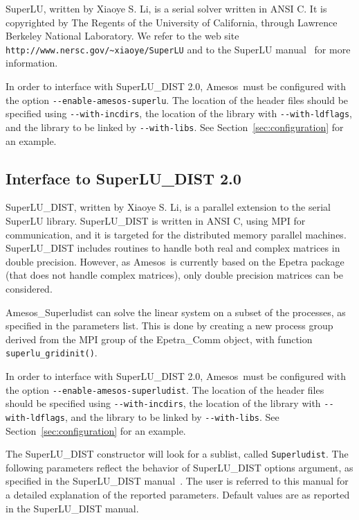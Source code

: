 \documentclass[11pt]{SANDreport}
\newcommand{\amesos}{{\sc Amesos}}
\begin{document}
SuperLU, written by Xiaoye S. Li, is a serial solver
written in ANSI C. It is copyrighted by The Regents of the University of
California, through Lawrence Berkeley National Laboratory.  We refer to
the web site
\verb!http://www.nersc.gov/~xiaoye/SuperLU!
and to the SuperLU manual~\cite{superlu-manual} for more
information.

In order to interface with SuperLU\_DIST 2.0, \amesos\ must be configured with
the option \verb!--enable-amesos-superlu!.
The location of the header files should be specified using \verb!--with-incdirs!,
the location of the library with \verb!--with-ldflags!, and the library
to be linked by \verb!--with-libs!. See Section~\ref{sec:configuration} for an
example.

\subsection{Interface to SuperLU\_DIST 2.0}
\label{sec:superludist}

SuperLU\_DIST, written by Xiaoye S. Li, is a parallel extension to the
serial SuperLU library.  SuperLU\_DIST is written in ANSI C, using MPI
for communication, and it is targeted for the distributed memory
parallel machines.  SuperLU\_DIST includes routines to handle both real
and complex matrices in double precision. However, as \amesos\ is
currently based on the Epetra package (that does not handle complex
matrices), only double precision matrices can be considered.

Amesos\_Superludist can solve the linear system on a subset of the
processes, as specified in the parameters list. This is done by
creating a new process group derived from the MPI group of the
Epetra\_Comm object, with function \verb!superlu_gridinit()!. 

In order to interface with SuperLU\_DIST 2.0, \amesos\ must be configured with
the option \verb!--enable-amesos-superludist!.
The location of the header files should be specified using \verb!--with-incdirs!,
the location of the library with \verb!--with-ldflags!, and the library
to be linked by \verb!--with-libs!. See Section~\ref{sec:configuration} for an
example.

\medskip

The SuperLU\_DIST constructor will look for a sublist, called
\verb!Superludist!.  The following parameters reflect the behavior of
SuperLU\_DIST options argument, as specified in the SuperLU\_DIST
manual~\cite[pages 55--56]{superlu-manual}. The user is referred to this
manual for a detailed explanation of the reported parameters. Default
values are as reported in the SuperLU\_DIST manual.
\end{document}
